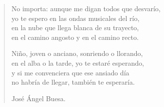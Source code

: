 \documentclass[11pt, portrait, twoside, notitlepage, openright]{book}
\begin{document}
\begin{verse}
No importa: aunque me digan todos que desvarío,\\
yo te espero en las ondas musicales del río,\\
en la nube que llega blanca de su trayecto,\\
en el camino angosto y en el camino recto.
\newline

Niño, joven o anciano, sonriendo o llorando,\\
en el alba o la tarde, yo te estaré esperando,\\
y si me convenciera que ese ansiado día\\
no habría de llegar, también te esperaría.
\newline

José Ángel Buesa.
\end{verse}
\end{document}
